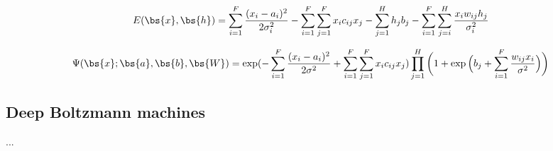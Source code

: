 

\begin{equation}
E(\bs{x},\bs{h})= \sum_{i=1}^F\frac{(x_i-a_i)^2}{2\sigma_i^2} - \sum_{i=1}^F\sum_{j=1}^Fx_ic_{ij}x_j- \sum_{j=1}^Hh_jb_j-\sum_{i=1}^F\sum_{j=i}^H \frac{x_iw_{ij}h_j}{\sigma_i^2} 
\label{eq:partlygaussianbinary}
\end{equation}

\begin{equation}
\Psi(\bs{x};\bs{a},\bs{b},\bs{W})=\exp(-\sum_{i=1}^F\frac{(x_i-a_i)^2}{2\sigma^2}+\sum_{i=1}^F\sum_{j=1}^Fx_ic_{ij}x_j)\prod_{j=1}^H\bigg(1+\exp\Big(b_j+\sum_{i=1}^F\frac{w_{ij}x_i}{\sigma^2}\Big)\bigg)
\label{eq:PNQSWF}
\end{equation}

\subsection{Deep Boltzmann machines}
...